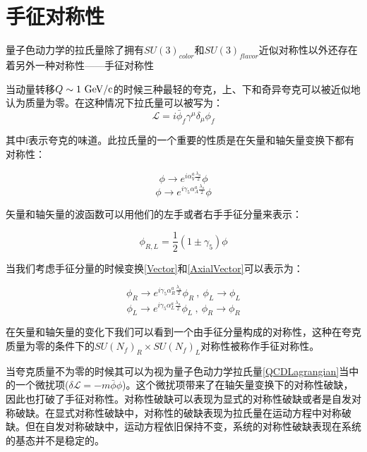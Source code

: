 \section{手征对称性}

量子色动力学的拉氏量除了拥有$SU(3)_{color}$和$SU(3)_{flavor}$近似对称性以外还存在着另外一种对称性——手征对称性

当动量转移$Q \sim 1 {\rm~GeV/c}$的时候三种最轻的夸克，上、下和奇异夸克可以被近似地认为质量为零。在这种情况下拉氏量可以被写为：
\begin{equation}
    \label{QCDLagrangian}
    \mathcal{L} = i\bar{\phi}_f \gamma^{\mu} \delta_{\mu} \phi_{f}
\end{equation}

其中f表示夸克的味道。此拉氏量的一个重要的性质是在矢量和轴矢量变换下都有对称性：

\begin{equation}
    \label{Vector}
    \phi \rightarrow e^{i \alpha^{a}_{V}\frac{\lambda_a}{2}} \phi
\end{equation}
\begin{equation}
    \label{AxialVector}
    \phi \rightarrow e^{i \gamma_5 \alpha^{a}_{A}\frac{\lambda_a}{2}} \phi
\end{equation}

矢量和轴矢量的波函数可以用他们的左手或者右手手征分量来表示：

\begin{equation}
    \phi_{R,L} = \frac{1}{2}(1 \pm \gamma_5) \phi
\end{equation}

当我们考虑手征分量的时候变换\ref{Vector}和\ref{AxialVector}可以表示为：

\begin{equation}
    \phi_R \rightarrow e^{i \gamma_5 \alpha^{a}_{R}\frac{\lambda_a}{2}} \phi_R~,~\phi_L \rightarrow \phi_L
\end{equation}
\begin{equation}
    \phi_L \rightarrow e^{i \gamma_5 \alpha^{a}_{L}\frac{\lambda_a}{2}} \phi_L~,~\phi_R \rightarrow \phi_R
\end{equation}

在矢量和轴矢量的变化下我们可以看到一个由手征分量构成的对称性，这种在夸克质量为零的条件下的$SU(N_f)_{R} \times SU(N_f)_{L}$对称性被称作手征对称性。

当夸克质量不为零的时候其可以为视为量子色动力学拉氏量\ref{QCDLagrangian}当中的一个微扰项($\delta\mathcal{L} = -m\bar{\phi}\phi$)。这个微扰项带来了在轴矢量变换下的对称性破缺，因此也打破了手征对称性。对称性破缺可以表现为显式的对称性破缺或者是自发对称破缺。在显式对称性破缺中，对称性的破缺表现为拉氏量在运动方程中对称破缺。但在自发对称破缺中，运动方程依旧保持不变，系统的对称性破缺表现在系统的基态并不是稳定的。

